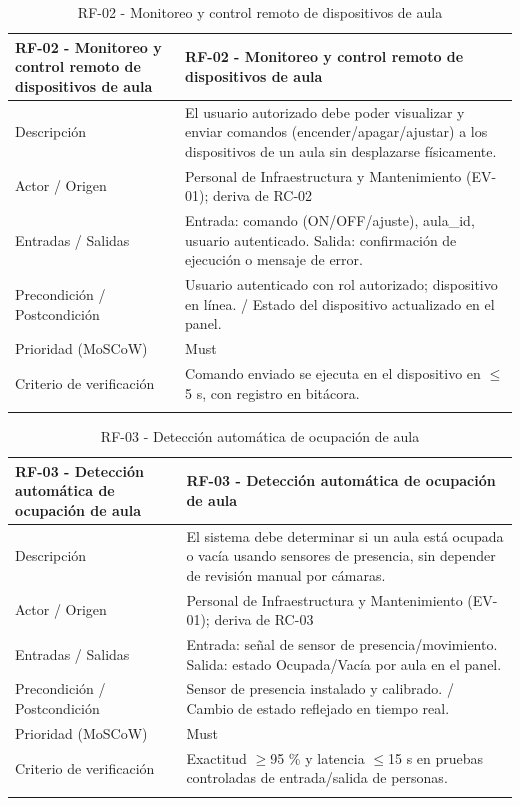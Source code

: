 \begingroup
\small
\begin{longtable}{|p{7.8cm}|p{7.8cm}|}
\hline
RF-02 - Monitoreo y control remoto de dispositivos de aula & RF-02 - Monitoreo y control remoto de dispositivos de aula \\ \hline
Descripción & El usuario autorizado debe poder visualizar y enviar comandos (encender/apagar/ajustar) a los dispositivos de un aula sin desplazarse físicamente. \\ \hline
Actor / Origen & Personal de Infraestructura y Mantenimiento (EV-01); deriva de RC-02 \\ \hline
Entradas / Salidas & Entrada: comando (ON/OFF/ajuste), aula\_id, usuario autenticado. Salida: confirmación de ejecución o mensaje de error. \\ \hline
Precondición / Postcondición & Usuario autenticado con rol autorizado; dispositivo en línea. / Estado del dispositivo actualizado en el panel. \\ \hline
Prioridad (MoSCoW) & Must \\ \hline
Criterio de verificación & Comando enviado se ejecuta en el dispositivo en $\leq$5 s, con registro en bitácora. \\ \hline
\caption{RF-02 - Monitoreo y control remoto de dispositivos de aula}
\end{longtable}
\endgroup

\begingroup
\small
\begin{longtable}{|p{7.8cm}|p{7.8cm}|}
\hline
RF-03 - Detección automática de ocupación de aula & RF-03 - Detección automática de ocupación de aula \\ \hline
Descripción & El sistema debe determinar si un aula está ocupada o vacía usando sensores de presencia, sin depender de revisión manual por cámaras. \\ \hline
Actor / Origen & Personal de Infraestructura y Mantenimiento (EV-01); deriva de RC-03 \\ \hline
Entradas / Salidas & Entrada: señal de sensor de presencia/movimiento. Salida: estado Ocupada/Vacía por aula en el panel. \\ \hline
Precondición / Postcondición & Sensor de presencia instalado y calibrado. / Cambio de estado reflejado en tiempo real. \\ \hline
Prioridad (MoSCoW) & Must \\ \hline
Criterio de verificación & Exactitud $\geq$95 \% y latencia $\leq$15 s en pruebas controladas de entrada/salida de personas. \\ \hline
\caption{RF-03 - Detección automática de ocupación de aula}
\end{longtable}
\endgroup

